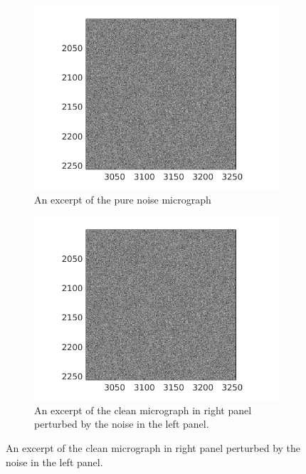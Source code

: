 \documentclass[12pt]{article}
\newcommand{\1}{\mathbf{1}}
\theoremstyle{plain}
\theoremstyle{definition}
\theoremstyle{remark}
\theoremstyle{plain}
\theoremstyle{remark}
\theoremstyle{plain}
\theoremstyle{plain}
\begin{document}
\begin{figure}[h]
	\centering
	\begin{subfigure}[t]{0.3\textwidth}
		\centering
		\includegraphics[scale=0.4]{pure_noise_micrograph_cutout.png}
		\caption{An excerpt of the pure noise micrograph}
	\end{subfigure} \hfill %
	\begin{subfigure}[t]{0.3\textwidth}
		\centering
		\includegraphics[scale=0.4]{noisy_micrograph_cutout.png}
		\caption{An excerpt of the clean micrograph in right panel perturbed by the noise in the left panel.}
	\end{subfigure} \hfill %

\end{figure}
\end{document}
